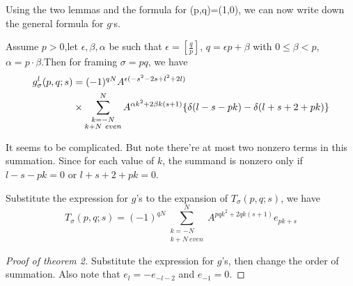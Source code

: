 Using the two lemmas and the formula for (p,q)=(1,0), we can now write down the
general formula for $g^,$s.


\begin{theorem} Assume $p>0$,let $\epsilon, \beta, \alpha$ be such that $\epsilon=[\frac{q}{p}]$, $q=\epsilon p+\beta$ with
$0\le \beta<p$, $\alpha=p\cdot\beta$.Then for framing $\sigma=pq$, we have
\begin{align} g_\sigma^l(p,q;s)&=(-1)^{qN} A^{\epsilon
(-s^2-2s+l^2+2l)}\notag\\
&\times\sum_{ \substack {k=-N\\ k+N\ even}}^N A^{\alpha {k}^2+2\beta k
(s+1)}\{\delta(l-s-pk)-\delta(l+s+2+pk)\}\notag\end{align}
\end{theorem}

It seems to be complicated. But note there're at most two nonzero terms in this summation. Since for each value of $k$, the
summand is nonzero only if $l-s-pk=0$ or $l+s+2+pk=0$.

\begin{theorem} Substitute the expression for $g$'s to the expansion of $T_\sigma(p,q;s)$, we have
\[T_\sigma(p,q;s)=(-1)^{qN}\sum_{ \substack {k=-N\\ k+N\ even}}^N A^{pqk^2+2qk(s+1)} e_{pk+s}\]
\end{theorem}

\begin{proof}[Proof of theorem 2] Substitute the expression for $g$'s, then change the order of summation. Also note that
$e_l=-e_{-l-2}$ and $e_{-1}=0$.
\end{proof}
